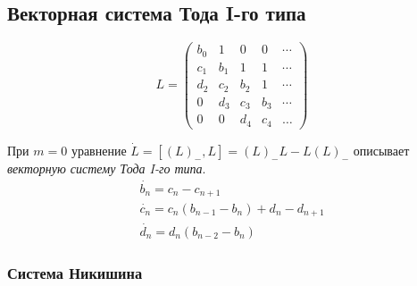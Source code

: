 \documentclass{report}
\begin{document}
\subsection {Векторная система Тода I-го типа}

\begin{equation}
\label{Toda1}
L=
\left(\begin{array}{cccccccccccc}
b_0 & 1 & 0 & 0 &  \cdots \\
c_1 & b_1 & 1 & 1 &  \cdots \\
d_2 & c_2 & b_2 & 1 &  \cdots \\
0 & d_3 & c_3 & b_3 &  \cdots \\
0 & 0 & d_4 & c_4 & \ldots
\end{array}\right)
\end{equation}

При $m=0$ уравнение $\dot{L}=[(L)_{-},L]=(L)_{-}L-L(L)_{-}$ описывает \emph {векторную систему Тода I-го типа}. 
$$
\begin{array}{lllllllllllllll}
\dot{b_n} = c_{n} - c_{n+1} \\
\dot{c_n} = c_n (b_{n-1} - b_{n}) + d_n - d_{n+1} \\
\dot{d_n} = d_n (b_{n-2} - b_n)
\end{array}
$$

\subsubsection {Система Никишина}
\end{document}
